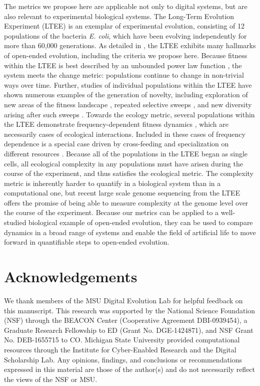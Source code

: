 \documentclass[letterpaper]{article}
\begin{document}
The metrics we propose here are applicable not only to digital systems, but are also relevant to experimental biological systems. The Long-Term Evolution Experiment (LTEE) \citep{lenski_long-term_1991} is an exemplar of experimental evolution, consisting of 12 populations of the bacteria \textit{E. coli}, which have been evolving independently for more than 60,000 generations.  As detailed in \citep{taylor_open-ended_2016}, the LTEE exhibits many hallmarks of open-ended evolution, including the criteria we propose here.  Because fitness within the LTEE is best described by an unbounded power law function \citep{wiser_long-term_2013,lenski_sustained_2015}, the system meets the change metric: populations continue to change in non-trivial ways over time.  Further, studies of individual populations within the LTEE have shown numerous examples of the generation of novelty, including exploration of new areas of the fitness landscape \citep{tenaillon_tempo_2016}, repeated selective sweeps \citep{maddamsetti_adaptation_2015}, and new diversity arising after such sweeps \citep{blount_genomic_2012}.   Towards the ecology metric, several populations within the LTEE demonstrate frequency-dependent fitness dynamics \citep{ribeck_modeling_2015,rozen_longterm_2000,le_gac_ecological_2012,maddamsetti_adaptation_2015}, which are necessarily cases of ecological interactions.  Included in these cases of frequency dependence is a special case \citep{blount_historical_2008,blount_genomic_2012,turner_replaying_2015} driven by cross-feeding and specialization on different resources \citep{turner_evolution_2015}.  Because all of the populations in the LTEE began as single cells, all ecological complexity in any populations must have arisen during the course of the experiment, and thus satisfies the  ecological metric.  The complexity metric is inherently harder to quantify in a biological system than in a computational one, but recent large scale genome sequencing from the LTEE \citep{tenaillon_tempo_2016} offers the promise of being able to measure complexity at the genome level over the course of the experiment. Because our metrics can be applied to a well-studied biological example of open-ended evolution, they can be used to compare dynamics in a broad range of systems and enable the field of artificial life to move forward in quantifiable steps to open-ended evolution.

\section{Acknowledgements}
We thank members of the MSU Digital Evolution Lab for helpful feedback on this manuscript. This research was supported by the National Science Foundation (NSF) through the BEACON Center (Cooperative Agreement DBI-0939454), a Graduate Research Fellowship to ED (Grant No. DGE-1424871), and NSF Grant No. DEB-1655715 to CO. Michigan State University provided computational resources through the Institute for Cyber-Enabled Research and the Digital Scholarship Lab. Any opinions, findings, and conclusions or recommendations expressed in this material are those of the author(s) and do not necessarily reflect the views of the NSF or MSU.



\end{document}
